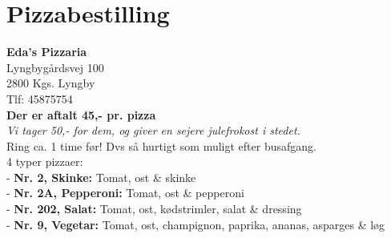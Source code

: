 
\section{Pizzabestilling}
\textbf{Eda's Pizzaria}\\
Lyngbygårdsvej 100\\
2800 Kgs. Lyngby\\

Tlf: 45875754\\

\textbf{Der er aftalt 45,- pr. pizza}\\
\textit{Vi tager 50,- for dem, og giver en sejere julefrokost i stedet.}\\
Ring ca. 1 time før! Dvs så hurtigt som muligt efter busafgang.\\

4 typer pizzaer:\\
- \textbf{Nr. 2, Skinke:} Tomat, ost \& skinke\\
- \textbf{Nr. 2A, Pepperoni:} Tomat, ost \& pepperoni\\
- \textbf{Nr. 202, Salat:} Tomat, ost, kødstrimler, salat \& dressing\\
- \textbf{Nr. 9, Vegetar:} Tomat, ost, champignon, paprika, ananas, asparges \& løg\\
